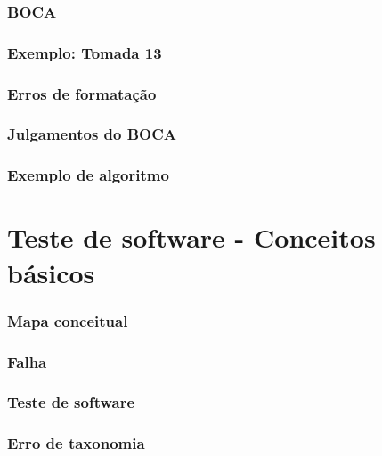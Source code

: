 \documentclass[utf8, usepdftitle=false, svgnames, color={table,
fixpdftex, hyperref, fixinclude, xcdraw}, t, brazil]{beamer}
\begin{document}
 \section{BOCA}
 
 
 \section{Exemplo: Tomada 13}
 
 
 \section{Erros de formatação}
 
 
 \section{Julgamentos do BOCA}
 
 
 \section{Exemplo de algoritmo}
 
 
 \part{Teste de software - Conceitos básicos}
 
 \section{Mapa conceitual}
 
 
 \section{Falha}
 
 
 \section{Teste de software}
 
 
 \section{Erro de taxonomia}
 
 
\end{document}
